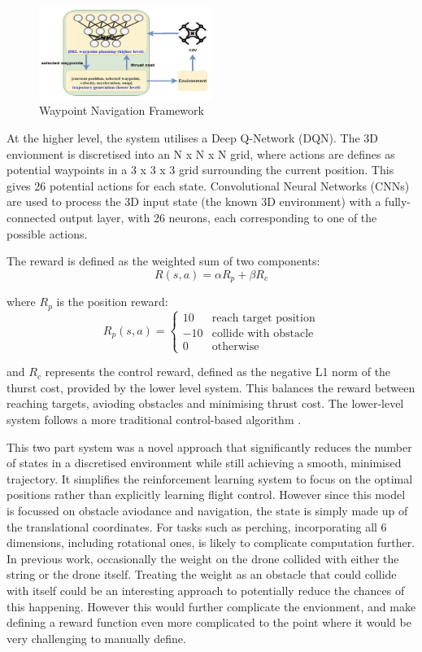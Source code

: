 \begin{figure}[htbp]
  \centering
  \includegraphics[width=0.5\textwidth]{background/fyp12-waypoint-nav-framework.png}
  \caption{Waypoint Navigation Framework}
\label{fig:fyp12-waypoint-nav-framework}
\end{figure}

At the higher level, the system utilises a Deep Q-Network (DQN).
The 3D envionment is discretised into an N x N x N grid, where actions are defines as potential waypoints in a 3 x 3 x 3 grid surrounding the current position.
This gives 26 potential actions for each state.
Convolutional Neural Networks (CNNs) are used to process the 3D input state (the known 3D environment) with a fully-connected output layer, with 26 neurons, each corresponding to one of the possible actions.

The reward is defined as the weighted sum of two components:
\[R(s, a) = \alpha R_{p} + \beta R_{c}\]

where $R_{p}$ is the position reward:
\[
R_{p}(s, a) = 
\begin{cases} 
10 & \text{reach target position} \\
-10 & \text{collide with obstacle} \\
0 & \text{otherwise}
\end{cases}
\]

and $R_{c}$ represents the control reward, defined as the negative L1 norm of the thurst cost, provided by the lower level system.
This balances the reward between reaching targets, avioding obstacles and minimising thrust cost.
The lower-level system follows a more traditional control-based algorithm \cite{fyp12-waypoint-nav2}.

This two part system was a novel approach that significantly reduces the number of states in a discretised environment while still achieving a smooth, minimised trajectory.
It simplifies the reinforcement learning system to focus on the optimal positions rather than explicitly learning flight control.
However since this model is focussed on obstacle aviodance and navigation, the state is simply made up of the translational coordinates.
For tasks such as perching, incorporating all 6 dimensions, including rotational ones, is likely to complicate computation further.
In previous work, occasionally the weight on the drone collided with either the string or the drone itself.
Treating the weight as an obstacle that could collide with itself could be an interesting approach to potentially reduce the chances of this happening.
However this would further complicate the envionment, and make defining a reward function even more complicated to the point where it would be very challenging to manually define. \\\\


